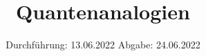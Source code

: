 

\subject{V23}
\title{Quantenanalogien}
\date{%
  Durchführung: 13.06.2022
  \hspace{3em}
  Abgabe: 24.06.2022
}



\maketitle
\thispagestyle{empty}
\tableofcontents
\newpage





\nocite{*}
\printbibliography{}


